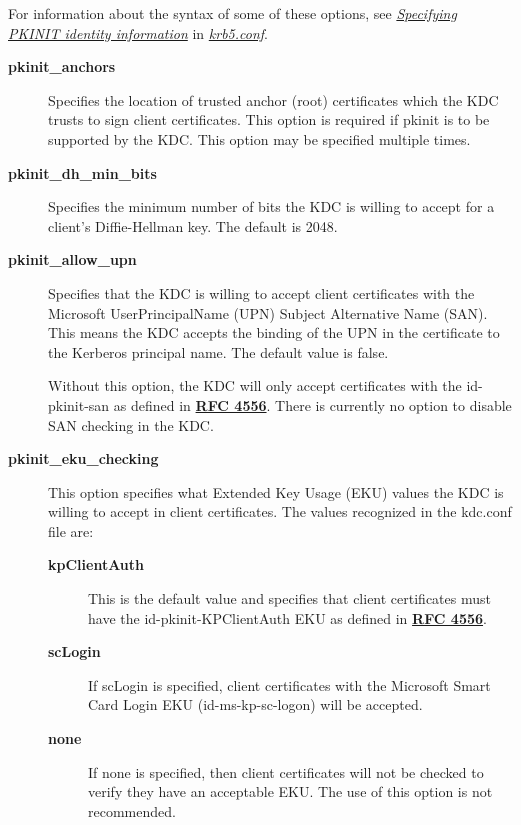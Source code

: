 \documentclass[letterpaper,10pt,english]{sphinxmanual}
\begin{document}
For information about the syntax of some of these options, see
{\hyperref[admin/conf_files/krb5_conf:pkinit-identity]{\emph{Specifying PKINIT identity information}}} in
{\hyperref[admin/conf_files/krb5_conf:krb5-conf-5]{\emph{krb5.conf}}}.
\begin{description}
\item[{\textbf{pkinit\_anchors}}] \leavevmode
Specifies the location of trusted anchor (root) certificates which
the KDC trusts to sign client certificates.  This option is
required if pkinit is to be supported by the KDC.  This option may
be specified multiple times.

\item[{\textbf{pkinit\_dh\_min\_bits}}] \leavevmode
Specifies the minimum number of bits the KDC is willing to accept
for a client's Diffie-Hellman key.  The default is 2048.

\item[{\textbf{pkinit\_allow\_upn}}] \leavevmode
Specifies that the KDC is willing to accept client certificates
with the Microsoft UserPrincipalName (UPN) Subject Alternative
Name (SAN).  This means the KDC accepts the binding of the UPN in
the certificate to the Kerberos principal name.  The default value
is false.

Without this option, the KDC will only accept certificates with
the id-pkinit-san as defined in \href{http://tools.ietf.org/html/rfc4556.html}{\textbf{RFC 4556}}.  There is currently
no option to disable SAN checking in the KDC.

\item[{\textbf{pkinit\_eku\_checking}}] \leavevmode
This option specifies what Extended Key Usage (EKU) values the KDC
is willing to accept in client certificates.  The values
recognized in the kdc.conf file are:
\begin{description}
\item[{\textbf{kpClientAuth}}] \leavevmode
This is the default value and specifies that client
certificates must have the id-pkinit-KPClientAuth EKU as
defined in \href{http://tools.ietf.org/html/rfc4556.html}{\textbf{RFC 4556}}.

\item[{\textbf{scLogin}}] \leavevmode
If scLogin is specified, client certificates with the
Microsoft Smart Card Login EKU (id-ms-kp-sc-logon) will be
accepted.

\item[{\textbf{none}}] \leavevmode
If none is specified, then client certificates will not be
checked to verify they have an acceptable EKU.  The use of
this option is not recommended.


\end{description}
\end{description}
\end{document}
